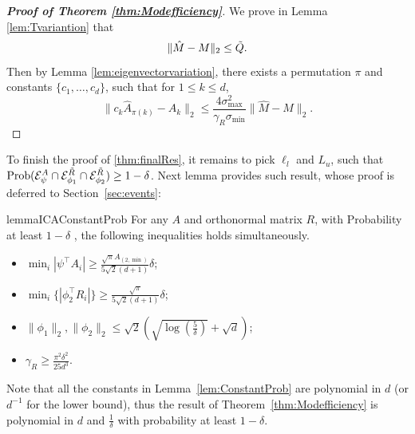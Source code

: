 \begin{proof}[{\bf Proof of Theorem \ref{thm:Modefficiency}}]
	We prove in Lemma \ref{lem:Tvariantion} that
	\[
	\|\hat{M} - M\|_2 \le \tilde{Q}.
	\]
	Then by Lemma \ref{lem:eigenvectorvariation}, there exists a permutation $\pi$ and constants $\{c_1,\ldots,c_d\}$, such that for $1\le k\le d$,
	\[
	\| c_k\hat{A}_{\pi(k)} - A_k\|_2 \le \frac{4\sigma^2_{\max}}{\gamma_R\sigma_{\min}} \|\hat{M} - M\|_2.
	\]
\end{proof}
To finish the proof of \cref{thm:finalRes}, it remains to pick $\ell_l$ and $L_u$, such that $\text{Prob}(\mathcal{E}^A_{\psi}\cap\mathcal{E}^{\tilde{R}}_{\phi_1}\cap\mathcal{E}^{\tilde{R}}_{\phi_2}) \ge 1-\delta$.
Next lemma provides such result, whose proof is deferred to Section~\ref{sec:events}:
\begin{restatable}{lemma}{ICAConstantProb}
	\label{lem:ConstantProb}
	For any $A$ and orthonormal matrix $R$, with Probability at least $1-\delta$ , the following inequalities holds simultaneously.
	\begin{itemize}
		\vspace{-3mm}
		\itemsep0em
		\item $\min_i |\psi^{\top}A_i| \ge \frac{\sqrt{\pi}A_{(2,\min)}}{5\sqrt{2}(d+1)} \delta$;
		\item $\min_i \{|\phi_2^{\top}R_i|\} \ge \frac{\sqrt{\pi}}{5\sqrt{2}(d+1)}\delta$;
		\item $\|\phi_1\|_2, \|\phi_2\|_2 \le \sqrt{2}\left(\sqrt{\log(\frac{5}{\delta})}+\sqrt{d}\right)$;
		\item $\gamma_R \ge \frac{\pi^2\delta^2}{25d^3}$.
	\end{itemize}
	\vspace{-2mm}
\end{restatable}
\begin{remark}
	Note that all the constants in Lemma~\ref{lem:ConstantProb} are polynomial in $d$ (or $d^{-1}$ for the lower bound), thus the result of Theorem~\ref{thm:Modefficiency} is polynomial in $d$ and $\frac{1}{\delta}$ with probability at least $1-\delta$. %
\end{remark}

